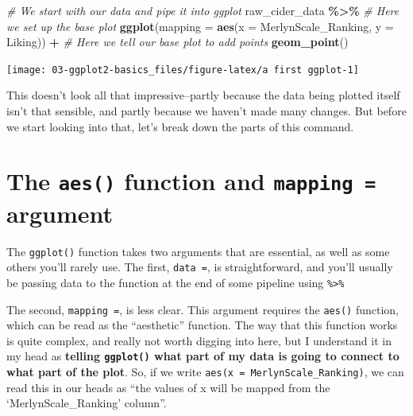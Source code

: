 \documentclass[
]{book}
\newenvironment{Shaded}{\begin{snugshade}}{\end{snugshade}}
\newcommand{\AttributeTok}[1]{\textcolor[rgb]{0.13,0.29,0.53}{#1}}
\newcommand{\CommentTok}[1]{\textcolor[rgb]{0.56,0.35,0.01}{\textit{#1}}}
\newcommand{\FunctionTok}[1]{\textcolor[rgb]{0.13,0.29,0.53}{\textbf{#1}}}
\newcommand{\NormalTok}[1]{#1}
\newcommand{\SpecialCharTok}[1]{\textcolor[rgb]{0.81,0.36,0.00}{\textbf{#1}}}
\begin{document}
\begin{Shaded}
\begin{Highlighting}[]
\CommentTok{\# We start with our data and pipe it into ggplot}
\NormalTok{raw\_cider\_data }\SpecialCharTok{\%\textgreater{}\%}
  \CommentTok{\# Here we set up the base plot}
  \FunctionTok{ggplot}\NormalTok{(}\AttributeTok{mapping =} \FunctionTok{aes}\NormalTok{(}\AttributeTok{x =}\NormalTok{ MerlynScale\_Ranking, }\AttributeTok{y =}\NormalTok{ Liking)) }\SpecialCharTok{+} 
   \CommentTok{\# Here we tell our base plot to add points}
  \FunctionTok{geom\_point}\NormalTok{()                          }
\end{Highlighting}
\end{Shaded}

\begin{center}\texttt{[image: 03-ggplot2-basics\_files/figure-latex/a first ggplot-1]} \end{center}

This doesn't look all that impressive--partly because the data being plotted itself isn't that sensible, and partly because we haven't made many changes. But before we start looking into that, let's break down the parts of this command.

\hypertarget{the-aes-function-and-mapping-argument}{%
\section{\texorpdfstring{The \texttt{aes()} function and \texttt{mapping\ =} argument}{The aes() function and mapping = argument}}\label{the-aes-function-and-mapping-argument}}

The \texttt{ggplot()} function takes two arguments that are essential, as well as some others you'll rarely use. The first, \texttt{data\ =}, is straightforward, and you'll usually be passing data to the function at the end of some pipeline using \texttt{\%\textgreater{}\%}

The second, \texttt{mapping\ =}, is less clear. This argument requires the \texttt{aes()} function, which can be read as the ``aesthetic'' function. The way that this function works is quite complex, and really not worth digging into here, but I understand it in my head as \textbf{telling \texttt{ggplot()} what part of my data is going to connect to what part of the plot}. So, if we write \texttt{aes(x\ =\ MerlynScale\_Ranking)}, we can read this in our heads as ``the values of x will be mapped from the `MerlynScale\_Ranking' column''.
\end{document}
